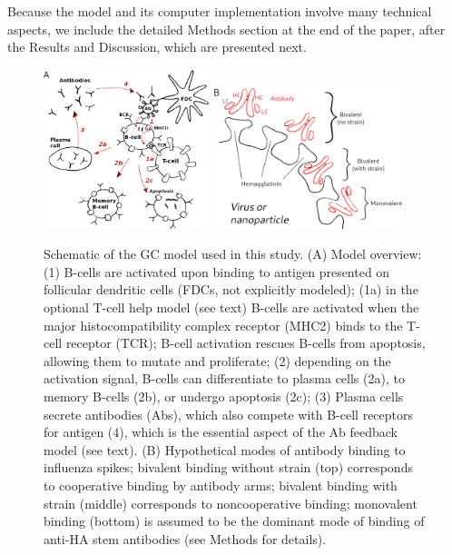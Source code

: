 \documentclass[utf8]{frontiersHLTH}%
\newcommand{\hfig}[1]{#1} %
\begin{document}
Because the model and its computer implementation involve many technical
aspects, we include the detailed Methods section at the end of the paper, after
the Results and Discussion, which are presented next.

\hfig{
\begin{figure}
\centering
\includegraphics[width=0.43\textwidth,valign=t]{model2i.png}
\hspace{2EM}
\includegraphics[width=0.49\textwidth,valign=t]{ab-ha-avidity3.png}
\caption{Schematic of the GC model used in this study. (A) Model overview: (1) B-cells are activated upon binding to antigen presented on
follicular dendritic cells (FDCs, not explicitly modeled); (1a) in the optional T-cell help model (see text) B-cells are
activated when the major histocompatibility complex receptor (MHC2) binds to the T-cell receptor (TCR); B-cell activation rescues
B-cells from apoptosis, allowing them to mutate and proliferate; (2) depending on the activation signal,
B-cells can differentiate to plasma cells (2a), to memory B-cells (2b), or undergo apoptosis (2c); (3) Plasma cells secrete antibodies
(Abs), which also compete with B-cell receptors for antigen (4), which is the essential aspect of the Ab feedback model\cite{zhang13}
(see text). (B) Hypothetical modes of antibody binding to influenza spikes; bivalent binding without strain (top) corresponds to
cooperative binding by antibody arms; bivalent binding with strain (middle) corresponds to noncooperative binding; monovalent binding (bottom) is assumed to be the
dominant mode of binding of anti-HA stem antibodies (see Methods for details).
}
\label{fig:model}
\end{figure}
}
\end{document}

